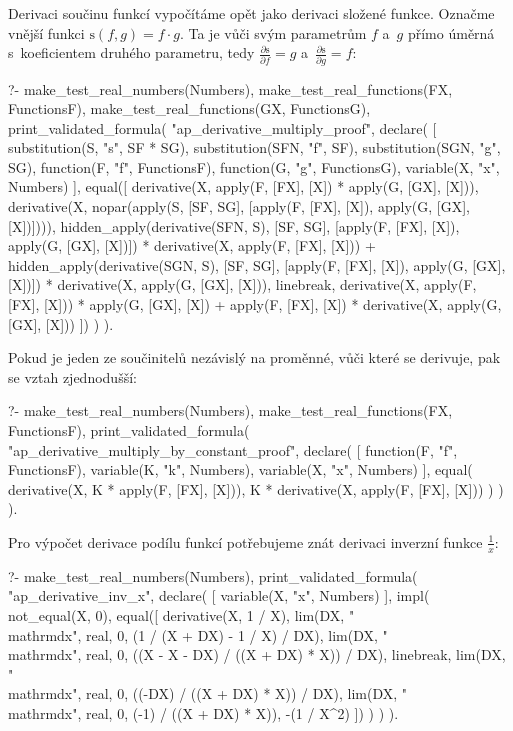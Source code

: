 Derivaci součinu funkcí vypočítáme opět jako derivaci složené funkce. Označme vnější funkci \(\mathrm{s}(f, g) = f \cdot g\). Ta je vůči svým parametrům \(f\) a~\(g\) přímo úměrná s~koeficientem druhého parametru, tedy \(\frac{\partial \mathrm{s}}{\partial f} = g\) a~\(\frac{\partial \mathrm{s}}{\partial g} = f\):


\begin{prolog}
?-	make_test_real_numbers(Numbers),
	make_test_real_functions(FX, FunctionsF),
	make_test_real_functions(GX, FunctionsG),
	print_validated_formula(
		"ap_derivative_multiply_proof",
		declare(
			[
				substitution(S, "s", SF * SG),
				substitution(SFN, "f", SF),
				substitution(SGN, "g", SG),
				function(F, "f", FunctionsF),
				function(G, "g", FunctionsG),
				variable(X, "x", Numbers)
			],
			equal([
				derivative(X, apply(F, [FX], [X]) * apply(G, [GX], [X])),
				derivative(X, nopar(apply(S, [SF, SG], [apply(F, [FX], [X]), apply(G, [GX], [X])]))),
				hidden_apply(derivative(SFN, S), [SF, SG], [apply(F, [FX], [X]), apply(G, [GX], [X])]) * derivative(X, apply(F, [FX], [X])) +
				hidden_apply(derivative(SGN, S), [SF, SG], [apply(F, [FX], [X]), apply(G, [GX], [X])]) * derivative(X, apply(G, [GX], [X])),
				linebreak,
				derivative(X, apply(F, [FX], [X])) * apply(G, [GX], [X]) + 
				apply(F, [FX], [X]) * derivative(X, apply(G, [GX], [X]))
			])
		)
	).
\end{prolog}

Pokud je jeden ze součinitelů nezávislý na proměnné, vůči které se derivuje, pak se vztah zjednodušší:

\begin{prolog}
?-	make_test_real_numbers(Numbers),
	make_test_real_functions(FX, FunctionsF),
	print_validated_formula(
		"ap_derivative_multiply_by_constant_proof",
		declare(
			[
				function(F, "f", FunctionsF),
				variable(K, "k", Numbers),
				variable(X, "x", Numbers)
			],
			equal(
				derivative(X, K * apply(F, [FX], [X])),
				K * derivative(X, apply(F, [FX], [X]))
			)
		)
	).
\end{prolog}

Pro výpočet derivace podílu funkcí potřebujeme znát derivaci inverzní funkce \(\frac{1}{x}\):


\begin{prolog}
?-	make_test_real_numbers(Numbers),
	print_validated_formula(
		"ap_derivative_inv_x",
		declare(
			[
				variable(X, "x", Numbers)
			],
			impl(
				not_equal(X, 0),
				equal([
					derivative(X, 1 / X),
					lim(DX, "\\mathrm{d}x", real, 0, (1 / (X + DX) - 1 / X) / DX),
					lim(DX, "\\mathrm{d}x", real, 0, ((X - X - DX) / ((X + DX) * X)) / DX),
					linebreak,				
					lim(DX, "\\mathrm{d}x", real, 0, ((-DX) / ((X + DX) * X)) / DX),
					lim(DX, "\\mathrm{d}x", real, 0, (-1) / ((X + DX) * X)),
					-(1 / X^2)
				])
			)
		)
	).
\end{prolog}

